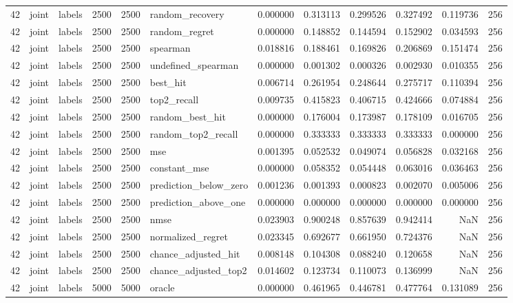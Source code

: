 \begin{tabular}{rllrrlrrrrrr}
42 & joint & labels & 2500 & 2500 & random_recovery & 0.000000 & 0.313113 & 0.299526 & 0.327492 & 0.119736 & 256 \\
42 & joint & labels & 2500 & 2500 & random_regret & 0.000000 & 0.148852 & 0.144594 & 0.152902 & 0.034593 & 256 \\
42 & joint & labels & 2500 & 2500 & spearman & 0.018816 & 0.188461 & 0.169826 & 0.206869 & 0.151474 & 256 \\
42 & joint & labels & 2500 & 2500 & undefined_spearman & 0.000000 & 0.001302 & 0.000326 & 0.002930 & 0.010355 & 256 \\
42 & joint & labels & 2500 & 2500 & best_hit & 0.006714 & 0.261954 & 0.248644 & 0.275717 & 0.110394 & 256 \\
42 & joint & labels & 2500 & 2500 & top2_recall & 0.009735 & 0.415823 & 0.406715 & 0.424666 & 0.074884 & 256 \\
42 & joint & labels & 2500 & 2500 & random_best_hit & 0.000000 & 0.176004 & 0.173987 & 0.178109 & 0.016705 & 256 \\
42 & joint & labels & 2500 & 2500 & random_top2_recall & 0.000000 & 0.333333 & 0.333333 & 0.333333 & 0.000000 & 256 \\
42 & joint & labels & 2500 & 2500 & mse & 0.001395 & 0.052532 & 0.049074 & 0.056828 & 0.032168 & 256 \\
42 & joint & labels & 2500 & 2500 & constant_mse & 0.000000 & 0.058352 & 0.054448 & 0.063016 & 0.036463 & 256 \\
42 & joint & labels & 2500 & 2500 & prediction_below_zero & 0.001236 & 0.001393 & 0.000823 & 0.002070 & 0.005006 & 256 \\
42 & joint & labels & 2500 & 2500 & prediction_above_one & 0.000000 & 0.000000 & 0.000000 & 0.000000 & 0.000000 & 256 \\
42 & joint & labels & 2500 & 2500 & nmse & 0.023903 & 0.900248 & 0.857639 & 0.942414 & NaN & 256 \\
42 & joint & labels & 2500 & 2500 & normalized_regret & 0.023345 & 0.692677 & 0.661950 & 0.724376 & NaN & 256 \\
42 & joint & labels & 2500 & 2500 & chance_adjusted_hit & 0.008148 & 0.104308 & 0.088240 & 0.120658 & NaN & 256 \\
42 & joint & labels & 2500 & 2500 & chance_adjusted_top2 & 0.014602 & 0.123734 & 0.110073 & 0.136999 & NaN & 256 \\
42 & joint & labels & 5000 & 5000 & oracle & 0.000000 & 0.461965 & 0.446781 & 0.477764 & 0.131089 & 256 \\

\end{tabular}
